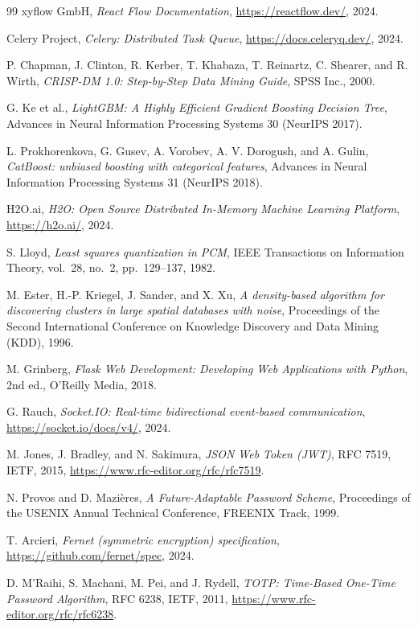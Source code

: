 \documentclass[12pt, a4paper, oneside]{report}
\begin{document}
\begin{thebibliography}{99}
xyflow GmbH,
\textit{React Flow Documentation},
\url{https://reactflow.dev/}, 2024.

Celery Project,
\textit{Celery: Distributed Task Queue},
\url{https://docs.celeryq.dev/}, 2024.

P. Chapman, J. Clinton, R. Kerber, T. Khabaza, T. Reinartz,
C. Shearer, and R. Wirth,
\textit{CRISP-DM 1.0: Step-by-Step Data Mining Guide},
SPSS Inc., 2000.

G. Ke et al.,
\textit{LightGBM: A Highly Efficient Gradient Boosting Decision Tree},
Advances in Neural Information Processing Systems 30 (NeurIPS 2017).

L. Prokhorenkova, G. Gusev, A. Vorobev, A. V. Dorogush, and A. Gulin,
\textit{CatBoost: unbiased boosting with categorical features},
Advances in Neural Information Processing Systems 31 (NeurIPS 2018).

H2O.ai,
\textit{H2O: Open Source Distributed In-Memory Machine Learning Platform},
\url{https://h2o.ai/}, 2024.

S. Lloyd,
\textit{Least squares quantization in PCM},
IEEE Transactions on Information Theory, vol.~28, no.~2, pp.~129--137, 1982.

M. Ester, H.-P. Kriegel, J. Sander, and X. Xu,
\textit{A density-based algorithm for discovering clusters in large
spatial databases with noise},
Proceedings of the Second International Conference on Knowledge
Discovery and Data Mining (KDD), 1996.

M. Grinberg,
\textit{Flask Web Development: Developing Web Applications with Python},
2nd ed., O'Reilly Media, 2018.

G. Rauch,
\textit{Socket.IO: Real-time bidirectional event-based communication},
\url{https://socket.io/docs/v4/}, 2024.

M. Jones, J. Bradley, and N. Sakimura,
\textit{JSON Web Token (JWT)},
RFC 7519, IETF, 2015,
\url{https://www.rfc-editor.org/rfc/rfc7519}.

N. Provos and D. Mazi\`eres,
\textit{A Future-Adaptable Password Scheme},
Proceedings of the USENIX Annual Technical Conference, FREENIX
Track, 1999.

T. Arcieri,
\textit{Fernet (symmetric encryption) specification},
\url{https://github.com/fernet/spec}, 2024.

D. M'Raihi, S. Machani, M. Pei, and J. Rydell,
\textit{TOTP: Time-Based One-Time Password Algorithm},
RFC 6238, IETF, 2011,
\url{https://www.rfc-editor.org/rfc/rfc6238}.


\end{thebibliography}
\end{document}
